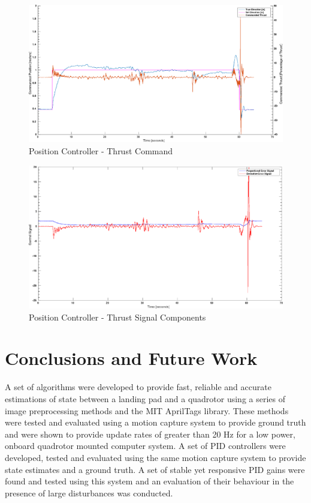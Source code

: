 \documentclass[11pt, twocolumn]{article}
\begin{document}
\begin{figure}
	\centering
	\includegraphics[width=\textwidth]{images/PID_Elevation_True_and_obs.eps}
	\caption{Position Controller - Thrust Command}
	\label{fig:pid_thrust_command}
\end{figure}

\begin{figure}
	\centering
	\includegraphics[width=\textwidth]{images/PID_Elevation_Controls.eps}
	\caption{Position Controller - Thrust Signal Components}
	\label{fig:pid_thrust_error}
\end{figure}


\section{Conclusions and Future Work}
A set of algorithms were developed to provide fast, reliable and accurate estimations of state between a landing pad and a quadrotor using a series of image preprocessing methods and the MIT AprilTags library. These methods were tested and evaluated using a motion capture system to provide ground truth and were shown to provide update rates of greater than 20 Hz for a low power, onboard quadrotor mounted computer system. A set of PID controllers were developed, tested and evaluated using the same motion capture system to provide state estimates and a ground truth. A set of stable yet responsive PID gains were found and tested using this system and an evaluation of their behaviour in the presence of large disturbances was conducted. 
\end{document}

